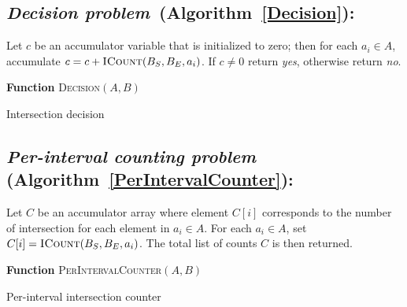 \subsection {{\em Decision problem}~(Algorithm~\ref{Decision}):} Let $c$ be an
accumulator variable that is initialized to zero; then for each $a_i \in A$,
accumulate $c = c + \textsc{ICount}(B_S,B_E,a_i)$.  If $c\ne0$ return {\em yes},
otherwise return {\em no}.
	 \begin{algorithm}[h!]
		\label{Decision}
	 	\DontPrintSemicolon
	 	\footnotesize
	 	\BlankLine
	 	\textbf{Function} \textsc{Decision}$(A,B)$

		\caption{Intersection decision}
		\label{Decision}
	 \end{algorithm}


\subsection {{\em Per-interval counting problem}
	(Algorithm~\ref{PerIntervalCounter}):}
	 Let $C$ be an accumulator array where element $C[i]$ corresponds to the
	 number of intersection for each element in $a_i\in A$.  For each 
	 $a_i \in A$, set $C[i]=\textsc{ICount}(B_S,B_E,a_i)$.  The total list of
	 counts $C$ is then returned.

	 \begin{algorithm}[h!]
	 	\DontPrintSemicolon
	 	\footnotesize
	 	\BlankLine
	 	\textbf{Function} \textsc{PerIntervalCounter}$(A,B)$
		\caption{Per-interval intersection counter}
		\label{PerIntervalCounter}
	 \end{algorithm}

